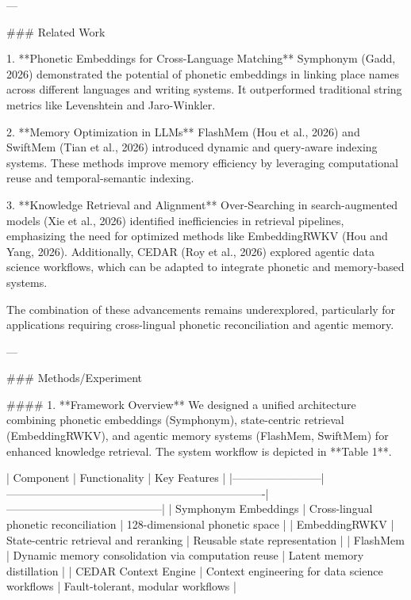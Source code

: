 ---

### Related Work  

1. **Phonetic Embeddings for Cross-Language Matching**  
   Symphonym (Gadd, 2026) demonstrated the potential of phonetic embeddings in linking place names across different languages and writing systems. It outperformed traditional string metrics like Levenshtein and Jaro-Winkler.

2. **Memory Optimization in LLMs**  
   FlashMem (Hou et al., 2026) and SwiftMem (Tian et al., 2026) introduced dynamic and query-aware indexing systems. These methods improve memory efficiency by leveraging computational reuse and temporal-semantic indexing.

3. **Knowledge Retrieval and Alignment**  
   Over-Searching in search-augmented models (Xie et al., 2026) identified inefficiencies in retrieval pipelines, emphasizing the need for optimized methods like EmbeddingRWKV (Hou and Yang, 2026). Additionally, CEDAR (Roy et al., 2026) explored agentic data science workflows, which can be adapted to integrate phonetic and memory-based systems.

The combination of these advancements remains underexplored, particularly for applications requiring cross-lingual phonetic reconciliation and agentic memory.

---

### Methods/Experiment  

#### 1. **Framework Overview**  
We designed a unified architecture combining phonetic embeddings (Symphonym), state-centric retrieval (EmbeddingRWKV), and agentic memory systems (FlashMem, SwiftMem) for enhanced knowledge retrieval. The system workflow is depicted in **Table 1**.

| Component              | Functionality                                                         | Key Features                              |
|------------------------|----------------------------------------------------------------------|------------------------------------------|
| Symphonym Embeddings   | Cross-lingual phonetic reconciliation                                | 128-dimensional phonetic space           |
| EmbeddingRWKV          | State-centric retrieval and reranking                               | Reusable state representation            |
| FlashMem               | Dynamic memory consolidation via computation reuse                  | Latent memory distillation               |
| CEDAR Context Engine   | Context engineering for data science workflows                      | Fault-tolerant, modular workflows        |

